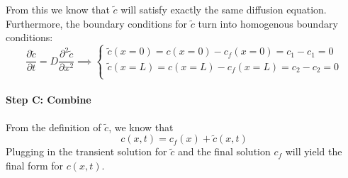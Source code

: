 From this we know that $\tilde c$ will satisfy exactly the same diffusion equation. Furthermore, the boundary conditions for $\tilde c$ turn into homogenous boundary conditions:
\begin{equation*}
	\frac{\partial \tilde c}{\partial t} = D\frac{\partial ^2 \tilde c}{\partial x^2}\implies\begin{cases}
		\tilde c(x=0) = c(x=0)-c_f(x=0)=c_1-c_1=0\\
		\tilde c(x=L) = c(x=L)-c_f(x=L)=c_2-c_2=0\\
	\end{cases}
\end{equation*}

\paragraph{Step C: Combine}
From the definition of $\tilde c$, we know that 
\begin{equation*}
	c(x,t) = c_f(x) + \tilde c(x,t)
\end{equation*}
Plugging in the transient solution for $\tilde c$ and the final solution $c_f$ will yield the final form for $c(x,t)$.

\setcounter{chapter}{3}
\renewcommand{\thechapter}{\arabic{chapter}}


